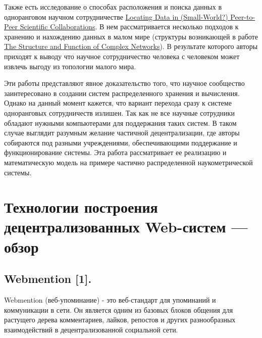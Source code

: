 Также есть исследование о способах расположения и поиска данных в
одноранговом научном сотрудничестве
\href{https://arxiv.org/pdf/cs/0209031.pdf}{Locating Data in
(Small-World?) Peer-to-Peer Scientific Collaborations}. В нем
рассматривается несколько подходов к хранению и нахождению данных в
малом мире (структуры возникающей в работе
\href{https://epubs.siam.org/doi/pdf/10.1137/S003614450342480?xid=PS_smithsonian}{The
Structure and Function of Complex Networks}). В результате которого
авторы приходят к выводу что научное сотрудничество человека с человеком
может извлечь выгоду из топологии малого мира.

Эти работы представляют явное доказательство того, что научное
сообщество заинтересовано в создании систем распределенного хранения и
вычисления. Однако на данный момент кажется, что вариант перехода сразу
к системе одноранговых сотрудничеств излишен. Так как не все научные
сотрудники обладают нужными компьютерами для поддержания таких систем. В
таком случае выглядит разумным желание частичной децентрализации, где
авторы собираются под разными учреждениями, обеспечивающими поддержание
и функционирование системы. Эта работа рассматривает ее реализацию и
математическую модель на примере частично распределенной
наукометрической системы.

\hypertarget{ux442ux435ux445ux43dux43eux43bux43eux433ux438ux438-ux43fux43eux441ux442ux440ux43eux435ux43dux438ux44f-ux434ux435ux446ux435ux43dux442ux440ux430ux43bux438ux437ux43eux432ux430ux43dux43dux44bux445-web-ux441ux438ux441ux442ux435ux43c--ux43eux431ux437ux43eux440}{%
\section{Технологии построения децентрализованных Web-систем ---
обзор}\label{ux442ux435ux445ux43dux43eux43bux43eux433ux438ux438-ux43fux43eux441ux442ux440ux43eux435ux43dux438ux44f-ux434ux435ux446ux435ux43dux442ux440ux430ux43bux438ux437ux43eux432ux430ux43dux43dux44bux445-web-ux441ux438ux441ux442ux435ux43c--ux43eux431ux437ux43eux440}}

\hypertarget{webmention-1}{%
\subsection{Webmention {[}1{]}.}\label{webmention-1}}

Webmention (веб-упоминание) - это веб-стандарт для упоминаний и
коммуникации в сети. Он является одним из базовых блоков общения для
растущего дерева комментариев, лайков, репостов и других разнообразных
взаимодействий в децентрализованной социальной сети.

